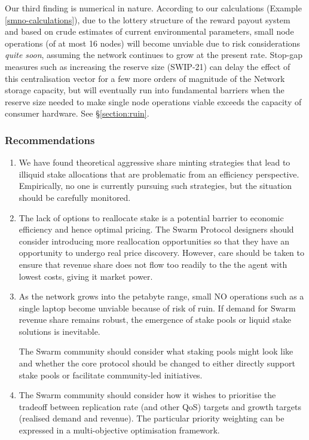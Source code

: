 Our third finding is numerical in nature.
%
According to our calculations (Example \ref{smno-calculations}), due to the lottery structure of the reward payout system and based on crude estimates of current environmental parameters, small node operations (of at most 16 nodes) will become unviable due to risk considerations \emph{quite soon}, assuming the network continues to grow at the present rate.
%
Stop-gap measures such as increasing the reserve size (SWIP-21) can delay the effect of this centralisation vector for a few more orders of magnitude of the Network storage capacity, but will eventually run into fundamental barriers when the reserve size needed to make single node operations viable exceeds the capacity of consumer hardware.
%
See \S\ref{section:ruin}.



\subsubsection{Recommendations}
\label{section:recommendations}

\begin{enumerate}
  \item
    We have found theoretical aggressive share minting strategies that lead to illiquid stake allocations that are problematic from an efficiency perspective.
    Empirically, no one is currently pursuing such strategies, but the situation should be carefully monitored.

  \item
    The lack of options to reallocate stake is a potential barrier to economic efficiency and hence optimal pricing.
    The Swarm Protocol designers should consider introducing more reallocation opportunities so that they have an opportunity to undergo real price discovery.
    However, care should be taken to ensure that revenue share does not flow too readily to the the agent with lowest costs, giving it market power.
    
  \item
    As the network grows into the petabyte range, small NO operations such as a single laptop become unviable because of risk of ruin.
    If demand for Swarm revenue share remains robust, the emergence of stake pools or liquid stake solutions is inevitable.

    The Swarm community should consider what staking pools might look like and whether the core protocol should be changed to either directly support stake pools or facilitate community-led initiatives.


  \item
    The Swarm community should consider how it wishes to prioritise the tradeoff between replication rate (and other QoS) targets and growth targets (realised demand and revenue).
    The particular priority weighting can be expressed in a multi-objective optimisation framework.

\end{enumerate}


